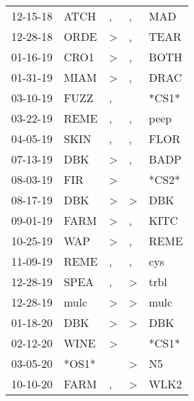 \begin{supertabular}{lllll}
 12-15-18 &   ATCH &                , &                , &    MAD \\
 12-28-18 &   ORDE &     \textgreater &                , &   TEAR \\
 01-16-19 &   CRO1 &     \textgreater &                , &   BOTH \\
 01-31-19 &   MIAM &     \textgreater &                , &   DRAC \\
 03-10-19 &   FUZZ &                , &                  &  *CS1* \\
 03-22-19 &   REME &                , &                , &   peep \\
 04-05-19 &   SKIN &                , &                , &   FLOR \\
 07-13-19 &    DBK &     \textgreater &                , &   BADP \\
 08-03-19 &    FIR &     \textgreater &                  &  *CS2* \\
 08-17-19 &    DBK &     \textgreater &     \textgreater &    DBK \\
 09-01-19 &   FARM &     \textgreater &                , &   KITC \\
 10-25-19 &    WAP &     \textgreater &                , &   REME \\
 11-09-19 &   REME &                , &                , &    cys \\
 12-28-19 &   SPEA &                , &     \textgreater &   trbl \\
 12-28-19 &   mulc &     \textgreater &     \textgreater &   mulc \\
 01-18-20 &    DBK &     \textgreater &     \textgreater &    DBK \\
 02-12-20 &   WINE &     \textgreater &                  &  *CS1* \\
 03-05-20 &  *OS1* &                  &     \textgreater &     N5 \\
 10-10-20 &   FARM &                , &     \textgreater &   WLK2 \\
\end{supertabular}
